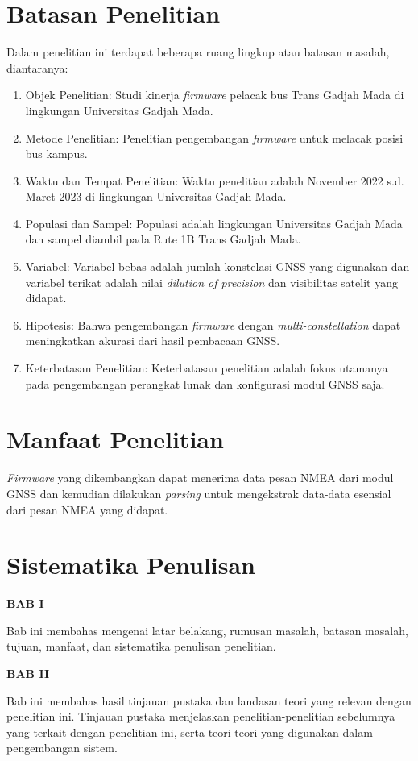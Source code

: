 \section{Batasan Penelitian}
Dalam penelitian ini terdapat beberapa ruang lingkup atau batasan masalah, diantaranya:
\begin{enumerate}
	\item Objek Penelitian: Studi kinerja \textit{firmware} pelacak bus Trans Gadjah Mada di lingkungan Universitas Gadjah Mada.
	\item Metode Penelitian: Penelitian pengembangan \textit{firmware} untuk melacak posisi bus kampus.
	\item Waktu dan Tempat Penelitian: Waktu penelitian adalah November 2022 s.d. Maret 2023 di lingkungan Universitas Gadjah Mada.
	\item Populasi dan Sampel: Populasi adalah lingkungan Universitas Gadjah Mada dan sampel diambil pada Rute 1B Trans Gadjah Mada.
	\item Variabel: Variabel bebas adalah jumlah konstelasi GNSS yang digunakan dan variabel terikat adalah nilai \textit{dilution of precision} dan visibilitas satelit yang didapat.
	\item Hipotesis: Bahwa pengembangan \textit{firmware} dengan \textit{multi-constellation} dapat meningkatkan akurasi dari hasil pembacaan GNSS.
	\item Keterbatasan Penelitian: Keterbatasan penelitian adalah fokus utamanya pada pengembangan perangkat lunak dan konfigurasi modul GNSS saja.
\end{enumerate}

\section{Manfaat Penelitian}
\textit{Firmware} yang dikembangkan dapat menerima data pesan NMEA dari modul GNSS dan kemudian dilakukan \textit{parsing} untuk mengekstrak data-data esensial dari pesan NMEA yang didapat.

\section{Sistematika Penulisan}
\textbf{BAB I}

Bab ini membahas mengenai latar belakang, rumusan masalah, batasan masalah, tujuan, manfaat, dan sistematika penulisan penelitian.

\textbf{BAB II}

Bab ini membahas hasil tinjauan pustaka dan landasan teori yang relevan dengan penelitian ini. Tinjauan pustaka menjelaskan penelitian-penelitian sebelumnya yang terkait dengan penelitian ini, serta teori-teori yang digunakan dalam pengembangan sistem.

